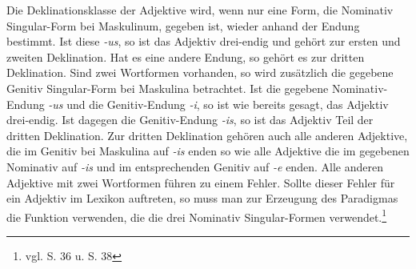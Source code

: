 Die Deklinationsklasse der Adjektive wird, wenn nur eine Form, die Nominativ Singular-Form bei Maskulinum, gegeben ist, wieder anhand der Endung bestimmt. Ist diese \textit{-us}, so ist das Adjektiv drei-endig und gehört zur ersten und zweiten Deklination. Hat es eine andere Endung, so gehört es zur dritten Deklination. Sind zwei Wortformen vorhanden, so wird zusätzlich die gegebene Genitiv Singular-Form bei Maskulina betrachtet. Ist die gegebene Nominativ-Endung \textit{-us} und die Genitiv-Endung \textit{-i}, so ist wie bereits gesagt, das Adjektiv drei-endig. Ist dagegen die Genitiv-Endung \textit{-is}, so ist das Adjektiv Teil der dritten Deklination. Zur dritten Deklination gehören auch alle anderen Adjektive, die im Genitiv bei Maskulina auf \textit{-is} enden so wie alle Adjektive die im gegebenen Nominativ auf \textit{-is} und im entsprechenden Genitiv auf \textit{-e} enden. Alle anderen Adjektive mit zwei Wortformen führen zu einem Fehler. Sollte dieser Fehler für ein Adjektiv im Lexikon auftreten, so muss man zur Erzeugung des Paradigmas die Funktion verwenden, die die drei Nominativ Singular-Formen verwendet.\footnote{vgl. \cite{BAYER-LINDAUER1994} S. 36 u. S. 38} \par
